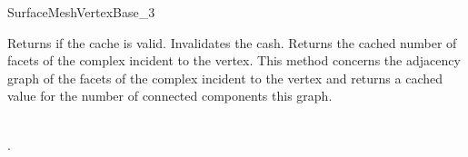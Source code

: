 \begin{ccRefConcept}{SurfaceMeshVertexBase_3}
\ccOperations


{Returns  if the cache is valid.}
\ccGlue
{}
{Invalidates the cash.}
\ccGlue
{}
{Returns the cached number of facets of the complex incident to the vertex.}
\ccGlue
{}
{ This method concerns the adjacency
graph of  the facets of the complex incident to the vertex
and returns a cached value for the number of connected components this graph.}

\ccHasModels



\ccSeeAlso

 \\
.





\end{ccRefConcept}


